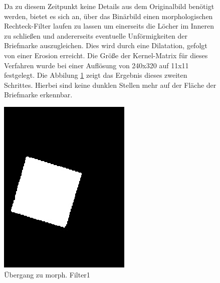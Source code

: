 \documentclass[12pt,toc=bib,toc=listof]{scrreprt}
\begin{document}
\begin{figure}[h]
\begin{minipage}[t]{.75\linewidth}
Da zu diesem Zeitpunkt keine Details aus dem Originalbild benötigt werden, bietet es sich an, über das Binärbild einen morphologischen Rechteck-Filter laufen zu lassen um einerseits die Löcher im Inneren zu schließen und andererseits eventuelle Unförmigkeiten der Briefmarke auszugleichen. Dies wird durch eine Dilatation, gefolgt von einer Erosion erreicht. Die Größe der Kernel-Matrix für dieses Verfahren wurde bei einer Auflösung von 240x320 auf 11x11 festgelegt. Die Abbilung \ref{fig:bv_morph1} zeigt das Ergebnis dieses zweiten Schrittes. Hierbei sind keine dunklen Stellen mehr auf der Fläche der Briefmarke erkennbar.
\end{minipage}
\hfill
\begin{minipage}[t]{.2\linewidth}
\strut\vspace*{-\baselineskip}
\newline
  \includegraphics[width=\linewidth]{./../bilder/bin1morph}
  \caption{Übergang zu morph. Filter1}
  \label{fig:bv_morph1}
\end{minipage}
\end{figure}
\end{document}
